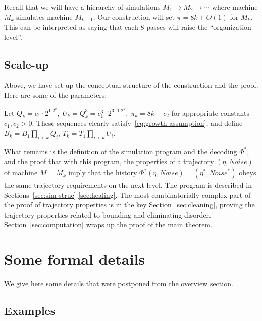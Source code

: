 \documentclass[11pt]{memoir}
\theoremstyle{definition} %
\def\B{B}
\def\U{U}
\newcommand{\Noise}{\mathit{Noise}}
\newcommand{\passno}{\pi}
\newcommand{\Q}{Q} %
\newcommand{\Tu}{T}
\begin{document}
Recall that we will have a hierarchy of simulations \( M_{1}\to M_{2}\to \dotsm \) where
machine \( M_{k} \) simulates machine \( M_{k+1} \).
Our construction will set \( \passno=8k + O(1) \) for \( M_{k} \).
This can be interpreted as saying that each 8 passes will raise the ``organization level''.

\subsection{Scale-up}

Above, we have set up the conceptual structure of the construction and the proof.
Here are some of the parameters: 

\begin{definition}\label{def:hier-params}
  Let
  \(
   \Q_{k}=c_{1}\cdot 2^{1.2^{k}},\;
   \U_{k} = \Q_{k}^{3}=c_{1}^{3}\cdot 2^{3\cdot 1.2^{k}},\;
   \passno_{k}=8 k + c_{2}
\)
for appropriate constants \( c_{1},c_{2}>0 \).
 These sequences clearly satisfy~\eqref{eq:growth-assumption}, and
 define \( \B_{k}=\B_{1}\prod_{i<k}\Q_{i} \), 
 \( \Tu_{k}=\Tu_{1}\prod_{i<k}\U_{i} \).
\end{definition}

What remains is the definition of the simulation program and the decoding \( \Phi^{*} \),
and the proof that with this
program, the properties of a trajectory \( (\eta,\Noise) \) of machine \( M=M_{k} \) imply
that the history \( \Phi^{*}(\eta,\Noise)=(\eta^{*},\Noise^{*}) \) obeys the same trajectory
requirements on the next level.
The program is described in Sections~\ref{sec:sim-struc}-\ref{sec:healing}.
The most combinatorially complex part of the proof of trajectory properties
is in the key Section~\ref{sec:cleaning}, proving the trajectory properties related to bounding and
eliminating disorder.
Section~\ref{sec:computation} wraps up the proof of the main theorem.



\section{Some formal details}

We give here some details that were postponed from the overview section.

\subsection{Examples}\label{sec:examples}
\end{document}
